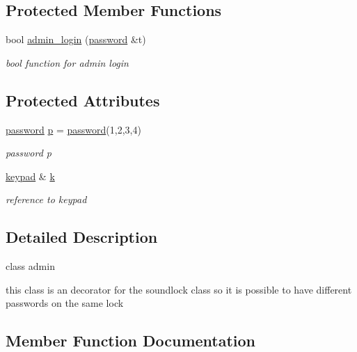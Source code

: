 \subsection*{Protected Member Functions}
\begin{DoxyCompactItemize}
\item 
bool \hyperlink{classadmin_a20b580f1add145870f3b14944b4edf1a}{admin\+\_\+login} (\hyperlink{classpassword}{password} \&t)\hypertarget{classadmin_a20b580f1add145870f3b14944b4edf1a}{}\label{classadmin_a20b580f1add145870f3b14944b4edf1a}

\begin{DoxyCompactList}\small\item\em bool function for admin login \end{DoxyCompactList}\end{DoxyCompactItemize}
\subsection*{Protected Attributes}
\begin{DoxyCompactItemize}
\item 
\hyperlink{classpassword}{password} \hyperlink{classadmin_a1d06b76a2e4750d8c98472cb0ae30f4f}{p} = \hyperlink{classpassword}{password}(1,2,3,4)
\begin{DoxyCompactList}\small\item\em password p \end{DoxyCompactList}\item 
\hyperlink{classkeypad}{keypad} \& \hyperlink{classadmin_a945025347c265cad582b368ceca788c3}{k}\hypertarget{classadmin_a945025347c265cad582b368ceca788c3}{}\label{classadmin_a945025347c265cad582b368ceca788c3}

\begin{DoxyCompactList}\small\item\em reference to keypad \end{DoxyCompactList}\end{DoxyCompactItemize}


\subsection{Detailed Description}
class admin 

this class is an decorator for the soundlock class so it is possible to have different passwords on the same lock 

\subsection{Member Function Documentation}
